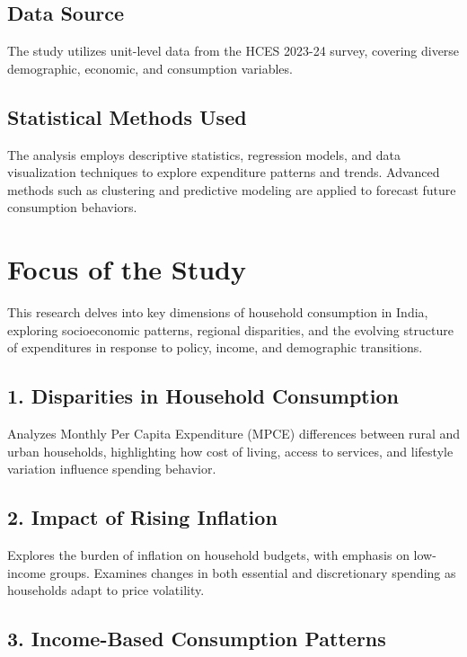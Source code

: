 \documentclass{article}
\begin{document}
	\subsection{Data Source}
	The study utilizes unit-level data from the HCES 2023-24 survey, covering diverse demographic, economic, and consumption variables.
	
	\subsection{Statistical Methods Used}
	The analysis employs descriptive statistics, regression models, and data visualization techniques to explore expenditure patterns and trends. Advanced methods such as clustering and predictive modeling are applied to forecast future consumption behaviors.
	
	

\section{Focus of the Study}

This research delves into key dimensions of household consumption in India, exploring socioeconomic patterns, regional disparities, and the evolving structure of expenditures in response to policy, income, and demographic transitions.

\subsection*{1. Disparities in Household Consumption}

Analyzes Monthly Per Capita Expenditure (MPCE) differences between rural and urban households, highlighting how cost of living, access to services, and lifestyle variation influence spending behavior.

\subsection*{2. Impact of Rising Inflation}

Explores the burden of inflation on household budgets, with emphasis on low-income groups. Examines changes in both essential and discretionary spending as households adapt to price volatility.

\subsection*{3. Income-Based Consumption Patterns}
\end{document}
